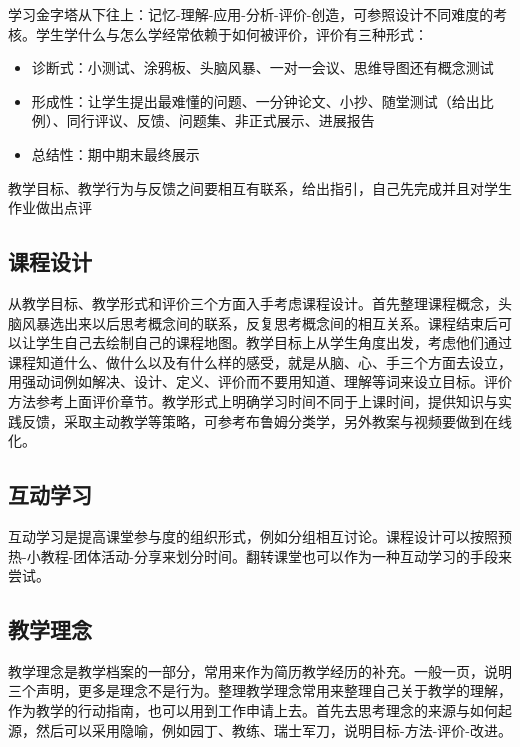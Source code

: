 \documentclass[]{tufte-book}
\providecommand{\tightlist}{%
  \setlength{\itemsep}{0pt}\setlength{\parskip}{0pt}}
\begin{document}
学习金字塔从下往上：记忆-理解-应用-分析-评价-创造，可参照设计不同难度的考核。学生学什么与怎么学经常依赖于如何被评价，评价有三种形式：

\begin{itemize}
\tightlist
\item
  诊断式：小测试、涂鸦板、头脑风暴、一对一会议、思维导图还有概念测试
\item
  形成性：让学生提出最难懂的问题、一分钟论文、小抄、随堂测试（给出比例）、同行评议、反馈、问题集、非正式展示、进展报告
\item
  总结性：期中期末最终展示
\end{itemize}

教学目标、教学行为与反馈之间要相互有联系，给出指引，自己先完成并且对学生作业做出点评

\hypertarget{ux8bfeux7a0bux8bbeux8ba1}{%
\subsection{课程设计}\label{ux8bfeux7a0bux8bbeux8ba1}}

从教学目标、教学形式和评价三个方面入手考虑课程设计。首先整理课程概念，头脑风暴选出来以后思考概念间的联系，反复思考概念间的相互关系。课程结束后可以让学生自己去绘制自己的课程地图。教学目标上从学生角度出发，考虑他们通过课程知道什么、做什么以及有什么样的感受，就是从脑、心、手三个方面去设立，用强动词例如解决、设计、定义、评价而不要用知道、理解等词来设立目标。评价方法参考上面评价章节。教学形式上明确学习时间不同于上课时间，提供知识与实践反馈，采取主动教学等策略，可参考布鲁姆分类学，另外教案与视频要做到在线化。

\hypertarget{ux4e92ux52a8ux5b66ux4e60}{%
\subsection{互动学习}\label{ux4e92ux52a8ux5b66ux4e60}}

互动学习是提高课堂参与度的组织形式，例如分组相互讨论。课程设计可以按照预热-小教程-团体活动-分享来划分时间。翻转课堂也可以作为一种互动学习的手段来尝试。

\hypertarget{ux6559ux5b66ux7406ux5ff5}{%
\subsection{教学理念}\label{ux6559ux5b66ux7406ux5ff5}}

教学理念是教学档案的一部分，常用来作为简历教学经历的补充。一般一页，说明三个声明，更多是理念不是行为。整理教学理念常用来整理自己关于教学的理解，作为教学的行动指南，也可以用到工作申请上去。首先去思考理念的来源与如何起源，然后可以采用隐喻，例如园丁、教练、瑞士军刀，说明目标-方法-评价-改进。
\end{document}
